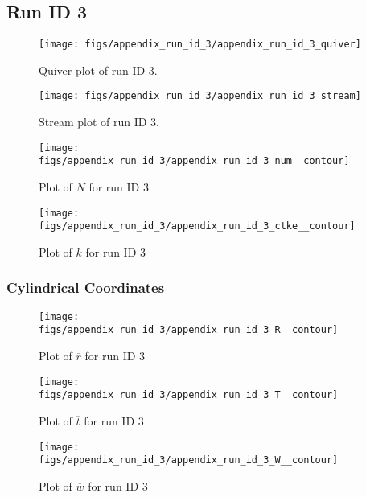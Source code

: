 \subsection{Run ID 3}
\begin{figure}[H]
\centering
\texttt{[image: figs/appendix\_run\_id\_3/appendix\_run\_id\_3\_quiver]}
\caption{Quiver plot of run ID 3.}
\label{fig:appendix_run_id_3_quiver}
\end{figure}


\begin{figure}[H]
\centering
\texttt{[image: figs/appendix\_run\_id\_3/appendix\_run\_id\_3\_stream]}
\caption{Stream plot of run ID 3.}
\label{fig:appendix_run_id_3_stream}
\end{figure}


\begin{figure}[H]
\centering
\texttt{[image: figs/appendix\_run\_id\_3/appendix\_run\_id\_3\_num\_\_contour]}
\caption{Plot of $N$ for run ID 3}
\label{fig:appendix_run_id_3_num__contour}
\end{figure}


\begin{figure}[H]
\centering
\texttt{[image: figs/appendix\_run\_id\_3/appendix\_run\_id\_3\_ctke\_\_contour]}
\caption{Plot of $k$ for run ID 3}
\label{fig:appendix_run_id_3_ctke__contour}
\end{figure}


\subsubsection{Cylindrical Coordinates}
\begin{figure}[H]
\centering
\texttt{[image: figs/appendix\_run\_id\_3/appendix\_run\_id\_3\_R\_\_contour]}
\caption{Plot of $\overline{r}$ for run ID 3}
\label{fig:appendix_run_id_3_R__contour}
\end{figure}


\begin{figure}[H]
\centering
\texttt{[image: figs/appendix\_run\_id\_3/appendix\_run\_id\_3\_T\_\_contour]}
\caption{Plot of $\overline{t}$ for run ID 3}
\label{fig:appendix_run_id_3_T__contour}
\end{figure}


\begin{figure}[H]
\centering
\texttt{[image: figs/appendix\_run\_id\_3/appendix\_run\_id\_3\_W\_\_contour]}
\caption{Plot of $\overline{w}$ for run ID 3}
\label{fig:appendix_run_id_3_W__contour}
\end{figure}


